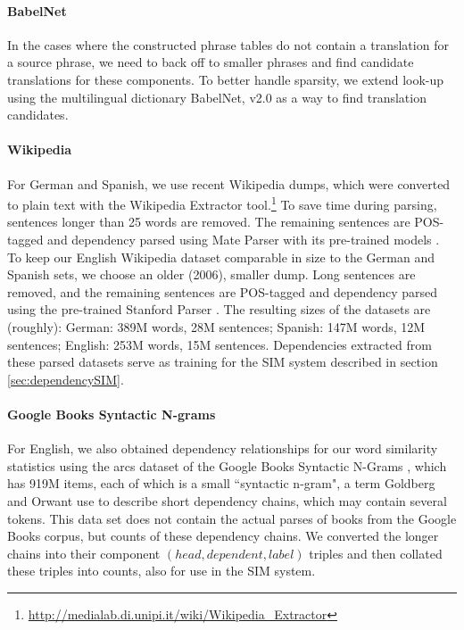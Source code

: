 \documentclass[11pt]{article}
\begin{document}
\paragraph{BabelNet} %

In the cases where the constructed phrase tables do not contain a translation
for a source phrase, we need to back off to smaller phrases and find
candidate translations for these components.  To better handle sparsity, we
extend look-up using the multilingual dictionary BabelNet, v2.0
\cite{Navigli:Ponzetto:12} as a way to find translation candidates.

\paragraph{Wikipedia} %

For German and Spanish, we use recent Wikipedia dumps, which were converted to
plain text with the Wikipedia Extractor tool.\footnote{\url{http://medialab.di.unipi.it/wiki/Wikipedia_Extractor}} To save time during parsing, sentences longer than 25 words are removed. The remaining sentences are POS-tagged and dependency parsed using Mate Parser with its pre-trained models \cite{bohnet:10,bohnet:kuhn:12,seeker:kuhn:13}. To keep our English Wikipedia dataset comparable in size to the German and Spanish sets, we choose an older (2006), smaller dump. Long sentences are removed, and the remaining sentences are POS-tagged and dependency parsed using the pre-trained Stanford Parser \cite{klein:manning:03,marneffe:maccartney:ea:06}. The resulting sizes of the datasets are (roughly): German: 389M words, 28M sentences; Spanish: 147M words, 12M sentences; English: 253M words, 15M sentences. Dependencies extracted from these parsed datasets serve as training for the SIM system described in section \ref{sec:dependencySIM}.

\paragraph{Google Books Syntactic N-grams}

For English, we also obtained dependency relationships for our word similarity
statistics using the arcs dataset of the Google Books Syntactic N-Grams
\cite{goldberg:orwant:13}, which has 919M items, each of which is a small
``syntactic n-gram", a term Goldberg and Orwant use to describe short
dependency chains, which may contain several tokens. This data set does not
contain the actual parses of books from the Google Books corpus, but counts of
these dependency chains. We converted the longer chains into their component
$(head,dependent,label)$ triples and then collated these triples into counts,
also for use in the SIM system.
\end{document}
